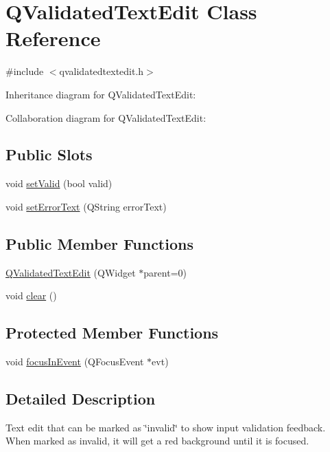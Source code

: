 \hypertarget{class_q_validated_text_edit}{}\section{Q\+Validated\+Text\+Edit Class Reference}
\label{class_q_validated_text_edit}


{\ttfamily \#include $<$qvalidatedtextedit.\+h$>$}



Inheritance diagram for Q\+Validated\+Text\+Edit\+:


Collaboration diagram for Q\+Validated\+Text\+Edit\+:
\subsection*{Public Slots}
\begin{DoxyCompactItemize}
\item 
void \hyperlink{class_q_validated_text_edit_ae7bbd8bc26efeb9f9900044391a68272}{set\+Valid} (bool valid)
\item 
void \hyperlink{class_q_validated_text_edit_a583500bc5a0c4c564cc920b724f8f78b}{set\+Error\+Text} (Q\+String error\+Text)
\end{DoxyCompactItemize}
\subsection*{Public Member Functions}
\begin{DoxyCompactItemize}
\item 
\hyperlink{class_q_validated_text_edit_a7266667905a9377fc0ab1741bede6071}{Q\+Validated\+Text\+Edit} (Q\+Widget $\ast$parent=0)
\item 
void \hyperlink{class_q_validated_text_edit_af2288206579ed0b08b9da6d7a9668fc9}{clear} ()
\end{DoxyCompactItemize}
\subsection*{Protected Member Functions}
\begin{DoxyCompactItemize}
\item 
void \hyperlink{class_q_validated_text_edit_a95d749d38769d2eb837af627f52a9872}{focus\+In\+Event} (Q\+Focus\+Event $\ast$evt)
\end{DoxyCompactItemize}


\subsection{Detailed Description}
Text edit that can be marked as \char`\"{}invalid\char`\"{} to show input validation feedback. When marked as invalid, it will get a red background until it is focused. 

